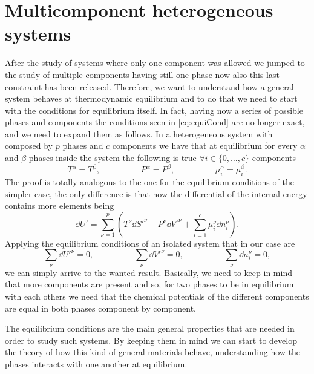 \section{Multicomponent heterogeneous systems}

After the study of systems where only one component was allowed we jumped to the study of multiple components having still one phase now also this last constraint has been released. Therefore, we want to understand how a general system behaves at thermodynamic equilibrium and to do that we need to start with the conditions for equilibrium itself. In fact, having now a series of possible phases and components the conditions seen in \eqref{eq:equiCond} are no longer exact, and we need to expand them as follows.
{
    In a heterogeneous system with composed by $p$ phases and $c$ components we have that at equilibrium for every $\alpha$ and $\beta$ phases inside the system the following is true $\forall i \in \{0, \dots, c\}$ components
    \begin{equation}
        \label{eq:GenralEquilibriumConditions}
        T^\alpha = T^\beta, \hspace{2cm} P^\alpha = P^\beta, \hspace{2cm} \mu^\alpha_i = \mu^\beta_i. 
    \end{equation}
}
{
    The proof is totally analogous to the one for the equilibrium conditions of the simpler case, the only difference is that now the differential of the internal energy contains more elements being
    \begin{equation}
        \dd U' = \sum_{\nu=1}^p\left( T^\nu \dd S'^\nu - P^\nu\dd V'^\nu + \sum_{i=1}^c \mu_i^\nu\dd n_i^\nu\right).
    \end{equation}
    Applying the equilibrium conditions of an isolated system that in our case are
    \begin{equation}
        \sum_\nu \dd U'^\nu = 0, \hspace{2cm} \sum_\nu \dd V'^\nu = 0, \hspace{2cm} \sum_\nu \dd n_i^\nu = 0,
    \end{equation}
    we can simply arrive to the wanted result.
}
\noindent
Basically, we need to keep in mind that more components are present and so, for two phases to be in equilibrium with each others we need that the chemical potentials of the different components are equal in both phases component by component.

The equilibrium conditions are the main general properties that are needed in order to study such systems. By keeping them in mind we can start to develop the theory of how this kind of general materials behave, understanding how the phases interacts with one another at equilibrium.

